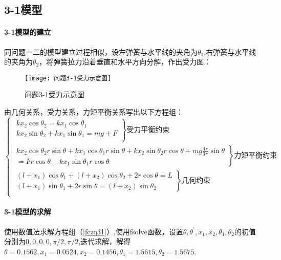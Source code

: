 \documentclass[withoutpreface,bwprint]{cumcmthesis} %
\begin{document}
	\subsection{3-1模型}
	\paragraph{3-1模型的建立}
	同问题一二的模型建立过程相似，设左弹簧与水平线的夹角为$\theta_1$,右弹簧与水平线的夹角为$\theta_2$，将弹簧拉力沿着垂直和水平方向分解，作出受力图：
					 \begin{figure}[H]
		\centering
		\texttt{[image: 问题3-1受力示意图]}
		\caption{问题3-1受力示意图}
		\label{问题3-1受力示意图}
	\end{figure}
   由几何关系，受力关系，力矩平衡关系写出以下方程组：
	\begin{equation}\label{fczq31}
	\left\{\begin{array}{l}
	\left.\begin{array}{l}
	k x_{2} \cos \theta_{2}=k x_{1} \cos \theta_{1} \\
	k x_{2} \sin \theta_{2}+k x_{1} \sin \theta_{1}=m g+F\\
	\end{array}\right\} \text{受力平衡约束}\\
	\left.\begin{array}{l}
	k x_{2} \cos \theta_{2} r \sin \theta+k x_{1} \cos \theta_{1}r\sin\theta + k x_{2} \sin \theta_{2} r \cos \theta+m g \frac{4 r}{3 \pi} \sin \theta \\
	=F r \cos \theta+k x_{1} \sin \theta_{1} r \cos \theta
	\end{array}\right\} \text{力矩平衡约束}\\
	\left.\begin{array}{l}
	\left(l+x_{1}\right) \cos \theta_{1}+\left(l+x_{2}\right) \cos \theta_{2}+2 r \cos \theta =L\\
	\left(l+x_{1}\right) \sin \theta_{1}+2 r \sin \theta=\left(l+x_{2}\right) \sin \theta_{2}
	\end{array}\right\} \text{几何约束}\\
	\end{array}\right.
	\end{equation}
\paragraph{3-1模型的求解}
使用数值法求解方程组（\ref{fczq31}）,使用fsolve函数，设置$\theta,\theta^{\prime},x_1,x_2,\theta_1,\theta_2$的初值分别为$0,0,0,0,\pi/2,\pi/2$,迭代求解，解得$\theta=0.1562,x_1=0.0524,x_2=0.1456,\theta_1 =1.5615,\theta_2 =1.5675$.
\end{document}
